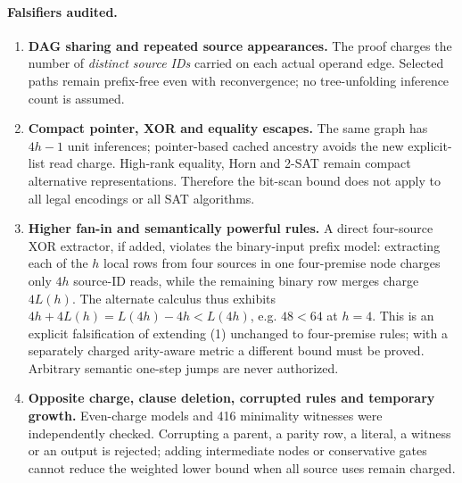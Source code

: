 \documentclass[11pt]{article}
\begin{document}
\paragraph{Falsifiers audited.}
\begin{enumerate}
\item[] \textbf{DAG sharing and repeated source appearances.} The proof charges the number of \emph{distinct source IDs} carried on each actual operand edge. Selected paths remain prefix-free even with reconvergence; no tree-unfolding inference count is assumed.
\item[] \textbf{Compact pointer, XOR and equality escapes.} The same graph has $4h-1$ unit inferences; pointer-based cached ancestry avoids the new explicit-list read charge. High-rank equality, Horn and 2-SAT remain compact alternative representations. Therefore the bit-scan bound does not apply to all legal encodings or all SAT algorithms.
\item[] \textbf{Higher fan-in and semantically powerful rules.} A direct four-source XOR extractor, if added, violates the binary-input prefix model: extracting each of the $h$ local rows from four sources in one four-premise node charges only $4h$ source-ID reads, while the remaining binary row merges charge $4L(h)$. The alternate calculus thus exhibits $4h+4L(h)=L(4h)-4h<L(4h)$, e.g. $48<64$ at $h=4$. This is an explicit falsification of extending (1) unchanged to four-premise rules; with a separately charged arity-aware metric a different bound must be proved. Arbitrary semantic one-step jumps are never authorized.
\item[] \textbf{Opposite charge, clause deletion, corrupted rules and temporary growth.} Even-charge models and 416 minimality witnesses were independently checked. Corrupting a parent, a parity row, a literal, a witness or an output is rejected; adding intermediate nodes or conservative gates cannot reduce the weighted lower bound when all source uses remain charged.
\end{enumerate}
\end{document}
